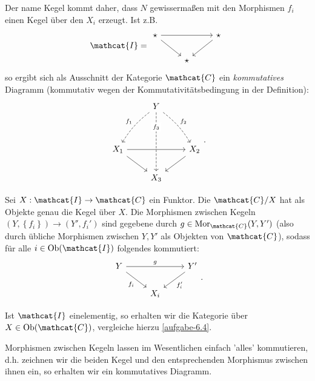 \begin{dremark}
    Der name Kegel kommt daher, dass $N$ gewissermaßen mit den Morphismen  $f_i$ einen Kegel über den  $X_i$ erzeugt. Ist z.B.
     \[
         \mathcat{I} = 
    \begin{tikzcd}
        \star \ar{rr} \ar{dr} & & \star \ar{dl} \\
                              & \star
    \end{tikzcd}
\]
so ergibt sich als Ausschnitt der Kategorie $\mathcat{C}$ ein \textit{kommutatives} Diagramm (kommutativ wegen der Kommutativitätsbedingung in der Definition):
\[
\begin{tikzcd}
    & Y\ar[bend right = 10, dashed,swap]{ddl}{f_1} \ar[dashed, "f_3" description, near start]{ddd} \ar[bend left = 10, dashed]{ddr}{f_2} \\
    \\
    X_1 \ar{dr}\ar{rr} & & X_2 \ar{dl}\\
                & X_3
\end{tikzcd}
.\]

\end{dremark}

\begin{definition}[Kegelkategorie]\label{def:kegelkategorie}
    Sei $X: \mathcat{I} \to  \mathcat{C}$ ein Funktor. Die  $\mathcat{C} / X$ hat als Objekte genau die Kegel über $X$. Die Morphismen zwischen Kegeln $(Y, \left \{f_i\right\}) \to (Y', f_i')$ sind gegebene durch $g\in \Mor_{\mathcat{C}}(Y,Y')$ (also durch übliche Morphismen zwischen $Y,Y'$ als Objekten von  $\mathcat{C}$), sodass für alle $i\in \Ob(\mathcat{I})$ folgendes kommutiert:
    \[
    \begin{tikzcd}
        Y \ar{rr}{g} \ar[swap]{dr}{f_i} & & Y' \ar{dl}{f_i'} \\
                                        & X_i
    \end{tikzcd}
    .\] 
\end{definition}

\begin{oral}
    Ist $\mathcat{I}$ einelementig, so erhalten wir die Kategorie über  $X\in \Ob(\mathcat{C})$, vergleiche hierzu \autoref{aufgabe-6.4}.
\end{oral}

\begin{remark*}
    Morphismen zwischen Kegeln lassen im Wesentlichen einfach 'alles' kommutieren, d.h. zeichnen wir die beiden Kegel und den entsprechenden Morphismus zwischen ihnen ein, so erhalten wir ein kommutatives Diagramm.
\end{remark*}


